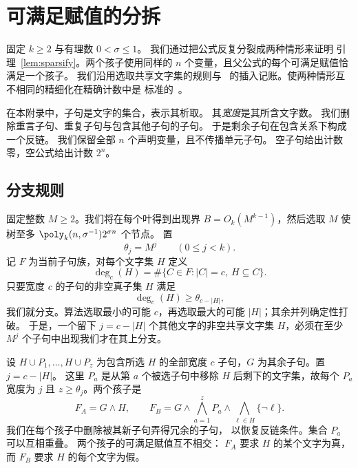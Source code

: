 \section{可满足赋值的分拆}\label{app:sparsify}

固定 $k\ge2$ 与有理数 $0<\sigma\le1$。
我们通过把公式反复分裂成两种情形来证明
引理~\ref{lem:sparsify}。两个孩子使用同样的 $n$
个变量，且父公式的每个可满足赋值恰满足一个孩子。
我们沿用选取共享文字集的规则与~\cite[Section~6]{CIP}
的插入记账。使两种情形互不相同的精细化在精确计数中是
标准的~\cite[Appendix~A]{DHMTW}。

在本附录中，子句是文字的集合，表示其析取。
其\emph{宽度}是其所含文字数。
我们删除重言子句、重复子句与包含其他子句的子句。
于是剩余子句在包含关系下构成一个反链。
我们保留全部 $n$ 个声明变量，且不传播单元子句。
空子句给出计数零，空公式给出计数 $2^n$。

\subsection{分支规则}

固定整数 $M\ge2$。我们将在每个叶得到出现界
$B=O_k(M^{k-1})$，然后选取 $M$ 使树至多
$\poly_k(n,\sigma^{-1})2^{\sigma n}$ 个节点。
置
\[
 \theta_j=M^j\qquad(0\le j<k).
\]
记 $F$ 为当前子句族，对每个文字集 $H$ 定义
\[
 \deg_c(H)=\#\{C\in F:|C|=c,\ H\subseteq C\}.
\]
只要宽度 $c$ 的子句的非空真子集 $H$ 满足
\begin{equation}\label{eq:spar-violation}
 \deg_c(H)\ge\theta_{c-|H|},
\end{equation}
我们就分支。算法选取最小的可能 $c$，再选取最大的可能
$|H|$；其余并列确定性打破。
于是，一个留下 $j=c-|H|$ 个其他文字的非空共享文字集
$H$，必须在至少 $M^j$ 个子句中出现我们才在其上分支。

设 $H\cup P_1,\ldots,H\cup P_z$ 为包含所选 $H$
的全部宽度 $c$ 子句，$G$ 为其余子句。置 $j=c-|H|$。
这里 $P_a$ 是从第 $a$ 个被选子句中移除 $H$
后剩下的文字集，故每个 $P_a$ 宽度为 $j$ 且
$z\ge\theta_j$。两个孩子是
\begin{equation}\label{eq:spar-children}
 F_A=G\wedge H,\qquad
 F_B=G\wedge\bigwedge_{a=1}^zP_a
          \wedge\bigwedge_{\ell\in H}\{\neg\ell\}.
\end{equation}
我们在每个孩子中删除被其新子句弄得冗余的子句，
以恢复反链条件。集合 $P_a$ 可以互相重叠。
两个孩子的可满足赋值互不相交：
$F_A$ 要求 $H$ 的某个文字为真，
而 $F_B$ 要求 $H$ 的每个文字为假。

